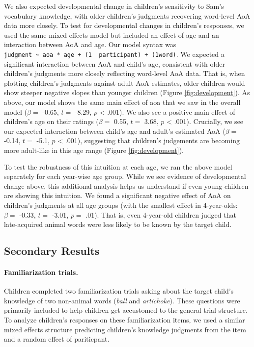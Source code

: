 \documentclass[10pt, letterpaper]{article}
\begin{document}
We also expected developmental change in children's sensitivity to Sam's
vocabulary knowledge, with older children's judgments recovering
word-level AoA data more closely. To test for developmental changes in
children's responses, we used the same mixed effects model but included
an effect of age and an interaction between AoA and age. Our model
syntax was
\texttt{judgment\ \textasciitilde{}\ aoa\ *\ age\ +\ (1\ \textbar{}\ participant)\ +\ (1\textbar{}word)}.
We expected a significant interaction between AoA and child's age,
consistent with older children's judgments more closely reflecting
word-level AoA data. That is, when plotting children's judgments against
adult AoA estimates, older children would show steeper negative slopes
than younger children (Figure \ref{fig:development}). As above, our
model shows the same main effect of aoa that we saw in the overall model
(\(\beta =\) -0.65, \(t =\) -8.29, \(p\) \textless{} .001). We also see
a positive main effect of children's age on their ratings (\(\beta =\)
0.55, \(t =\) 3.68, \(p\) \textless{} .001). Crucially, we see our
expected interaction between child's age and adult's estimated AoA
(\(\beta =\) -0.14, \(t =\) -5.1, \(p\) \textless{} .001), suggesting
that children's judgements are becoming more adult-like in this age
range (Figure \ref{fig:development}).

To test the robustness of this intuition at each age, we ran the above
model separately for each year-wise age group. While we see evidence of
developmental change above, this additional analysis helps us understand
if even young children are showing this intuition. We found a
significant negative effect of AoA on children's judgments at all age
groups (with the smallest effect in 4-year-olds: \(\beta =\) -0.33,
\(t =\) -3.01, \(p =\) .01). That is, even 4-year-old children judged
that late-acquired animal words were less likely to be known by the
target child.

\hypertarget{secondary-results}{%
\subsection{Secondary Results}\label{secondary-results}}

\hypertarget{familiarization-trials.}{%
\paragraph{Familiarization trials.}\label{familiarization-trials.}}

Children completed two familiarization trials asking about the target
child's knowledge of two non-animal words (\emph{ball} and
\emph{artichoke}). These questions were primarily included to help
children get accustomed to the general trial structure. To analyze
children's responses on these familiarization items, we used a similar
mixed effects structure predicting children's knowledge judgments from
the item and a random effect of pariticpant.
\end{document}
